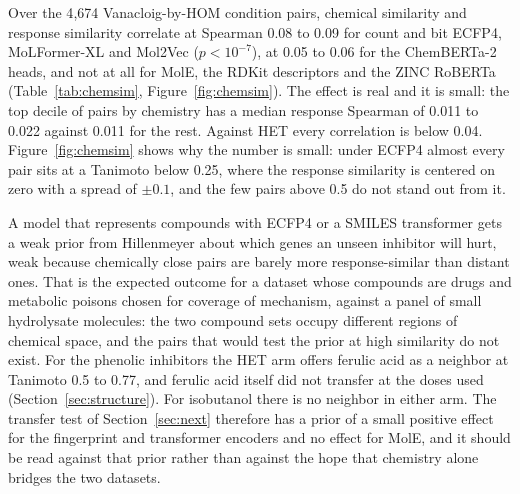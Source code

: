 Over the 4{,}674 Vanacloig-by-HOM condition pairs, chemical similarity and response
similarity correlate at Spearman 0.08 to 0.09 for count and bit ECFP4, MoLFormer-XL and
Mol2Vec ($p < 10^{-7}$), at 0.05 to 0.06 for the ChemBERTa-2 heads, and not at all for
MolE, the RDKit descriptors and the ZINC RoBERTa (Table~\ref{tab:chemsim},
Figure~\ref{fig:chemsim}). The effect is real and it is small: the top decile of pairs
by chemistry has a median response Spearman of 0.011 to 0.022 against 0.011 for the
rest. Against HET every correlation is below 0.04. Figure~\ref{fig:chemsim} shows why
the number is small: under ECFP4 almost every pair sits at a Tanimoto below 0.25, where
the response similarity is centered on zero with a spread of $\pm 0.1$, and the few pairs
above 0.5 do not stand out from it.


A model that represents compounds with ECFP4 or a SMILES transformer gets a weak prior
from Hillenmeyer about which genes an unseen inhibitor will hurt, weak because
chemically close pairs are barely more response-similar than distant ones. That is the
expected outcome for a dataset whose compounds are drugs and metabolic poisons chosen
for coverage of mechanism, against a panel of small hydrolysate molecules: the two
compound sets occupy different regions of chemical space, and the pairs that would test
the prior at high similarity do not exist. For the phenolic inhibitors the HET arm
offers ferulic acid as a neighbor at Tanimoto 0.5 to 0.77, and ferulic acid itself did
not transfer at the doses used (Section~\ref{sec:structure}). For isobutanol there is
no neighbor in either arm. The transfer test of Section~\ref{sec:next} therefore has a
prior of a small positive effect for the fingerprint and transformer encoders and no
effect for MolE, and it should be read against that prior rather than against the hope
that chemistry alone bridges the two datasets.
